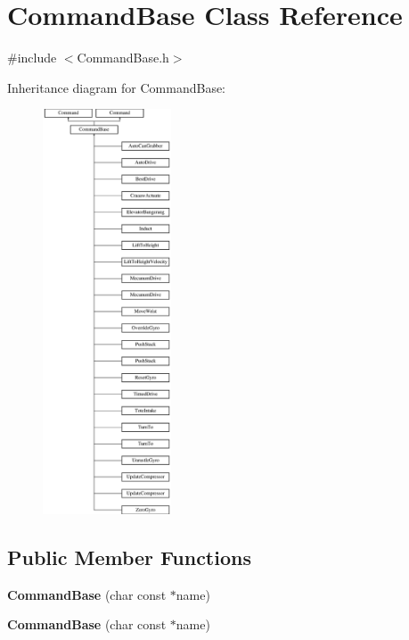 \hypertarget{class_command_base}{}\section{Command\+Base Class Reference}
\label{class_command_base}


{\ttfamily \#include $<$Command\+Base.\+h$>$}

Inheritance diagram for Command\+Base\+:\begin{figure}[H]
\begin{center}
\leavevmode
\includegraphics[height=12.000000cm]{class_command_base}
\end{center}
\end{figure}
\subsection*{Public Member Functions}
\begin{DoxyCompactItemize}
\item 
\hypertarget{class_command_base_a41d5830644dae72497af945aafac9176}{}{\bfseries Command\+Base} (char const $\ast$name)\label{class_command_base_a41d5830644dae72497af945aafac9176}

\item 
\hypertarget{class_command_base_a41d5830644dae72497af945aafac9176}{}{\bfseries Command\+Base} (char const $\ast$name)\label{class_command_base_a41d5830644dae72497af945aafac9176}

\end{DoxyCompactItemize}
